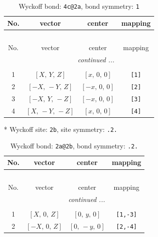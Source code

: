 \documentclass[fleqn,8pt]{jsarticle}
\begin{document}
\renewcommand{\arraystretch}{1.2}
\begin{longtable}{cccc}
\caption{Wyckoff bond: {\tt 4c@2a}, bond symmetry: {\tt 1}}
 \\
 \hline \hline
No. & vector & center & mapping \\ \hline \endfirsthead

\multicolumn{3}{l}{\tablename\ \thetable{}} \\
 \hline \hline
No. & vector & center & mapping \\ \hline \endhead

 \hline \hline
\multicolumn{3}{r}{\footnotesize\it continued ...} \\ \endfoot

 \hline \hline
\multicolumn{3}{r}{} \\ \endlastfoot

1 & $\left[ X,\, Y,\, Z \right]$ & $\left[ x,\, 0,\, 0 \right]$ & {\tt [1]} \\ \hline
2 & $\left[ - X,\, - Y,\, Z \right]$ & $\left[ - x,\, 0,\, 0 \right]$ & {\tt [2]} \\ \hline
3 & $\left[ - X,\, Y,\, - Z \right]$ & $\left[ - x,\, 0,\, 0 \right]$ & {\tt [3]} \\ \hline
4 & $\left[ X,\, - Y,\, - Z \right]$ & $\left[ x,\, 0,\, 0 \right]$ & {\tt [4]} \\
\end{longtable}
* Wyckoff site: {\tt 2b}, site symmetry: {\tt .2.}
\renewcommand{\arraystretch}{1.2}
\begin{longtable}{cccc}
\caption{Wyckoff bond: {\tt 2a@2b}, bond symmetry: {\tt .2.}}
 \\
 \hline \hline
No. & vector & center & mapping \\ \hline \endfirsthead

\multicolumn{3}{l}{\tablename\ \thetable{}} \\
 \hline \hline
No. & vector & center & mapping \\ \hline \endhead

 \hline \hline
\multicolumn{3}{r}{\footnotesize\it continued ...} \\ \endfoot

 \hline \hline
\multicolumn{3}{r}{} \\ \endlastfoot

1 & $\left[ X,\, 0,\, Z \right]$ & $\left[ 0,\, y,\, 0 \right]$ & {\tt [1,-3]} \\ \hline
2 & $\left[ - X,\, 0,\, Z \right]$ & $\left[ 0,\, - y,\, 0 \right]$ & {\tt [2,-4]} \\
\end{longtable}
\end{document}
